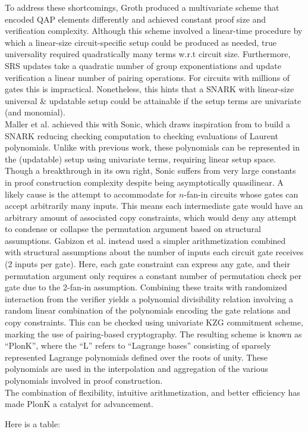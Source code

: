 \noindent To address these shortcomings, Groth produced a multivariate scheme that encoded QAP elements differently and achieved constant proof size and verification complexity. Although this scheme involved a linear-time procedure by which a linear-size circuit-specific setup could be produced as needed, true universality required quadratically many terms w.r.t circuit size. Furthermore, SRS updates take a quadratic number of group exponentiations and update verification a linear number of pairing operations. For circuits with millions of gates this is impractical. Nonetheless, this hints that a SNARK with linear-size universal \& updatable setup could be attainable if the setup terms are univariate (and monomial).\\

\noindent Maller et al. achieved this with Sonic, which draws inspiration from to build a SNARK reducing checking computation to checking evaluations of Laurent polynomials. Unlike with previous work, these polynomials can be represented in the (updatable) setup using univariate terms, requiring linear setup space. Though a breakthrough in its own right, Sonic suffers from very large constants in proof construction complexity despite being asymptotically quasilinear. A likely cause is the attempt to accommodate for $n$-fan-in circuits whose gates can accept arbitrarily many inputs. This means each intermediate gate would have an arbitrary amount of associated copy constraints, which would deny any attempt to condense or collapse the permutation argument based on structural assumptions. Gabizon et al. instead used a simpler arithmetization combined with structural assumptions about the number of inputs each circuit gate receives (2 inputs per gate). Here, each gate constraint can express any gate, and their permutation argument only requires a constant number of permutation check per gate due to the 2-fan-in assumption. Combining these traits with randomized interaction from the verifier yields a polynomial divisibility relation involving a random linear combination of the polynomials encoding the gate relations and copy constraints. This can be checked using univariate KZG commitment scheme, marking the use of pairing-based cryptography. The resulting scheme is known as ``PlonK'', where the ``L'' refers to ``Lagrange bases'' consisting of sparsely represented Lagrange polynomials defined over the roots of unity. These polynomials are used in the interpolation and aggregation of the various polynomials involved in proof construction.\\

\noindent The combination of flexibility, intuitive arithmetization, and better efficiency has made PlonK a catalyst for advancement.

\noindent Here is a table:

